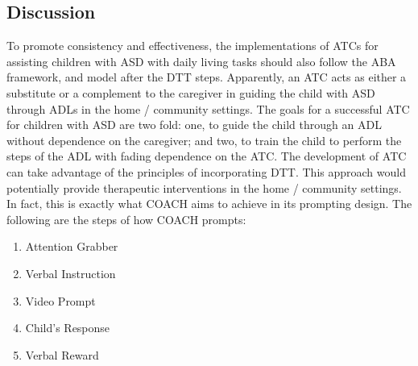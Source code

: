 

\subsection{Discussion}
\label{sec:DTTDiscussion}
To promote consistency and effectiveness, the implementations of ATCs for assisting children with ASD with daily living tasks should also follow the ABA framework, and model after the DTT steps.  Apparently, an ATC acts as either a substitute or a complement to the caregiver in guiding the child with ASD through ADLs in the home / community settings.  The goals for a successful ATC for children with ASD are two fold: one, to guide the child through an ADL without dependence on the caregiver; and two, to train the child to perform the steps of the ADL with fading dependence on the ATC. The development of ATC can take advantage of the principles of incorporating DTT.  This approach would potentially provide therapeutic interventions in the home / community settings.  In fact, this is exactly what COACH aims to achieve in its prompting design.  The following are the steps of how COACH prompts:
\begin{enumerate}
	\item Attention Grabber
	\item Verbal Instruction
	\item Video Prompt
	\item Child's Response
	\item Verbal Reward
\end{enumerate}
